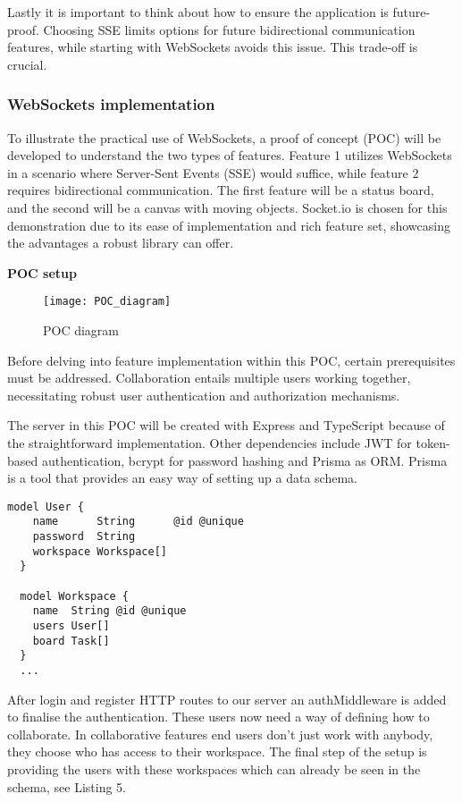 Lastly it is important to think about how to ensure the application is future-proof. Choosing SSE limits options for future bidirectional communication features, while starting with WebSockets avoids this issue. This trade-off is crucial. 

\subsubsection{WebSockets implementation}

To illustrate the practical use of WebSockets, a proof of concept (POC) will be developed to understand the two types of features. Feature 1 utilizes WebSockets in a scenario where Server-Sent Events (SSE) would suffice, while feature 2 requires bidirectional communication. The first feature will be a status board, and the second will be a canvas with moving objects. Socket.io is chosen for this demonstration due to its ease of implementation and rich feature set, showcasing the advantages a robust library can offer.

\textbf{POC setup}

\begin{figure}[h]
  \caption{POC diagram}
  \texttt{[image: POC\_diagram]}
  \centering
\end{figure}

Before delving into feature implementation within this POC, certain prerequisites must be addressed. Collaboration entails multiple users working together, necessitating robust user authentication and authorization mechanisms.

The server in this POC will be created with Express and TypeScript because of the straightforward implementation. Other dependencies include JWT for token-based authentication, bcrypt for password hashing and Prisma as ORM. Prisma is a tool that provides an easy way of setting up a data schema.

\begin{lstlisting}[caption=Prisma Data Schema]
  model User {
    name      String      @id @unique
    password  String
    workspace Workspace[]
  }

  model Workspace {
    name  String @id @unique
    users User[]
    board Task[]
  }
  ...
\end{lstlisting}

After login and register HTTP routes to our server an authMiddleware is added to finalise the authentication. These users now need a way of defining how to collaborate. In collaborative features end users don't just work with anybody, they choose who has access to their workspace. The final step of the setup is providing the users with these workspaces which can already be seen in the schema, see Listing 5.


